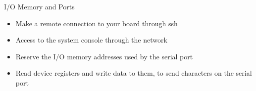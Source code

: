 \setuplabframe
{I/O Memory and Ports}
{
  \begin{itemize}
  \item Make a remote connection to your board through ssh
  \item Access to the system console through the network
  \item Reserve the I/O memory addresses used by the serial port
  \item Read device registers and write data to them, to send
    characters on the serial port
  \end{itemize}
}
